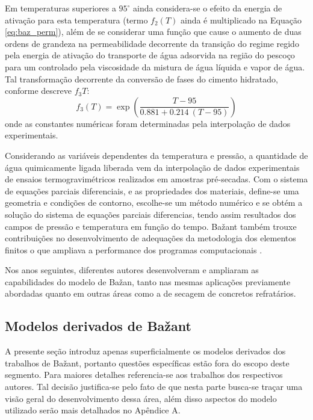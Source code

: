     
Em temperaturas superiores a $95^{\circ}$ ainda considera-se o efeito da energia
de ativação para esta temperatura (termo $f_2(T)$ ainda é
multiplicado na Equação \ref{eq:baz_perm}), além de se considerar uma função
que cause o aumento de duas ordens de grandeza na permeabilidade decorrente da
transição do regime regido pela energia de ativação do transporte de água
adsorvida na região do pescoço para um controlado pela viscosidade da mistura de
água líquida e vapor de água. Tal transformação decorrente da conversão de fases
do cimento hidratado, conforme descreve $f_3{T}$:
\begin{equation}
  \label{eq:f3}
  f_3(T) = \exp{\left( \frac{T-95}{0.881+0.214 \ (T-95)} \right)}
\end{equation}
onde as constantes numéricas foram determinadas pela interpolação de dados
experimentais.

Considerando as variáveis dependentes da temperatura e pressão, a quantidade de
água quimicamente ligada liberada vem da interpolação de dados experimentais de
ensaios termogravimétricos realizados em amostras pré-secadas. Com o sistema de
equações parciais diferenciais, e as propriedades dos materiais, define-se uma
geometria e condições de contorno, escolhe-se um método numérico e se obtém a
solução do sistema de equações parciais diferencias, tendo assim resultados dos
campos de pressão e temperatura em função do tempo. Ba\v{z}ant também trouxe
contribuições no desenvolvimento de adequações da metodologia dos elementos
finitos o que ampliava a performance dos programas computacionais \cite{bazant1978}.

Nos anos seguintes, diferentes autores desenvolveram e ampliaram as
capabilidades do modelo de Ba\v{z}an, tanto nas mesmas aplicações previamente
abordadas quanto em outras áreas como a de secagem de concretos refratários.
    
    
\subsection{Modelos derivados de Ba\v{z}ant}\label{sec:deriv_bazant}
A presente seção introduz apenas superficialmente os modelos derivados dos
trabalhos de Ba\v{z}ant, portanto questões específicas estão fora do escopo
deste segmento. Para maiores detalhes referencia-se aos trabalhos dos respectivos
autores. Tal decisão justifica-se pelo fato de que nesta parte busca-se traçar
uma visão geral do desenvolvimento dessa área, além disso aspectos do modelo
utilizado serão mais detalhados no Apêndice A.

